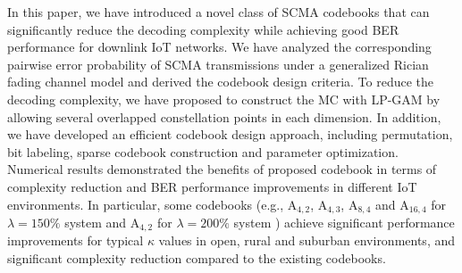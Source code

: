 \documentclass[journal]{IEEEtran}
\begin{document}
In this paper,  we have  introduced a novel  class of SCMA codebooks that  can significantly reduce the decoding complexity  while achieving  good BER performance
  for downlink IoT networks.  We    have analyzed  the corresponding pairwise  error probability   of SCMA transmissions under a generalized  Rician fading channel model and derived the codebook design criteria.   To reduce the decoding complexity, we have proposed to construct the MC with LP-GAM by allowing several overlapped constellation points in each dimension.   In addition, we have developed     an  efficient  codebook design approach, including permutation, bit labeling, sparse codebook construction and parameter optimization. 
Numerical results demonstrated the  benefits of proposed codebook in terms of complexity reduction and BER performance improvements in different  IoT  environments. In particular, some codebooks (e.g., $\text{A}_{4,2}$, $\text{A}_{4,3}$, $\text{A}_{8,4}$ and $\text{A}_{16,4}$ for   $ \lambda = 150\%$ system  and $\text{A}_{4,2}$ for $ \lambda = 200\%$ system ) achieve significant performance improvements for typical $\kappa $ values in  open, rural and suburban environments,  and significant complexity reduction compared  to the existing codebooks.



 
 
 
 




%
\end{document}
